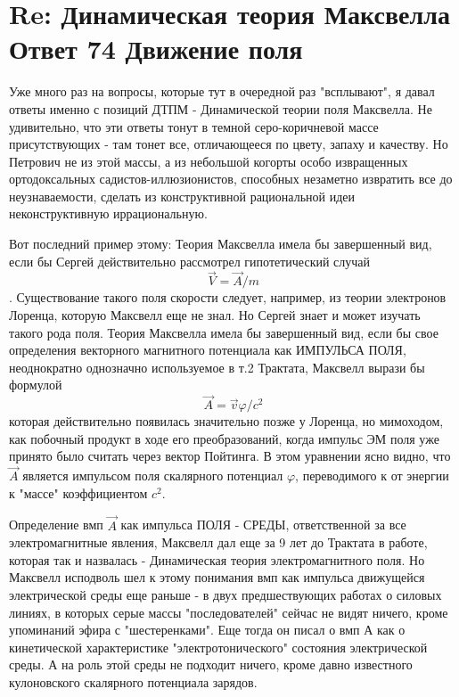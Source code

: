 \documentclass{article}
\begin{document}
\section{Re: Динамическая теория Максвелла Ответ 74  Движение поля}
Уже много раз  на вопросы, которые тут в очередной раз "всплывают", я давал  ответы именно с позиций ДТПМ - Динамической теории поля Максвелла.
Не удивительно, что эти ответы тонут в темной серо-коричневой массе присутствующих - там тонет все, отличающееся по цвету, запаху и качеству.
Но Петрович не из этой массы, а из небольшой когорты особо извращенных ортодоксальных садистов-иллюзионистов, способных незаметно извратить все до неузнаваемости, сделать из конструктивной рациональной идеи неконструктивную иррациональную.

Вот последний пример этому:
Теория Максвелла имела бы завершенный вид, если бы Сергей действительно рассмотрел гипотетический случай
$$\vec V=\vec A/m$$.
Существование такого поля скорости следует, например, из теории электронов Лоренца, которую Максвелл еще не знал.  Но Сергей знает и может изучать такого рода поля. %
Теория Максвелла имела бы завершенный вид, если бы свое определения векторного магнитного потенциала как ИМПУЛЬСА ПОЛЯ, неоднократно  однозначно используемое в т.2 Трактата, Максвелл вырази бы формулой
$$\vec A = \vec v \varphi /c^2$$
которая действительно появилась значительно позже у Лоренца, но мимоходом, как побочный продукт в ходе его преобразований, когда импульс ЭМ поля уже принято было считать через вектор Пойтинга.
В этом уравнении ясно видно, что $\vec A$ является импульсом поля скалярного потенциал $\varphi$, переводимого к от энергии к "массе" коэффициентом $c^2$.

Определение вмп $\vec A$ как импульса ПОЛЯ - СРЕДЫ, ответственной за все электромагнитные явления, Максвелл дал еще за 9 лет до Трактата в работе, которая так и назвалась - Динамическая теория электромагнитного поля.
Но Максвелл исподволь шел к этому понимания вмп как импульса движущейся электрической среды еще раньше - в двух предшествующих работах о силовых линиях, в которых серые массы "последователей" сейчас не видят ничего, кроме упоминаний эфира с "шестеренками". Еще тогда он писал о вмп А как о кинетической характеристике "электротонического" состояния электрической среды.
А на роль  этой среды не подходит ничего, кроме давно известного кулоновского скалярного потенциала зарядов.
\end{document}
